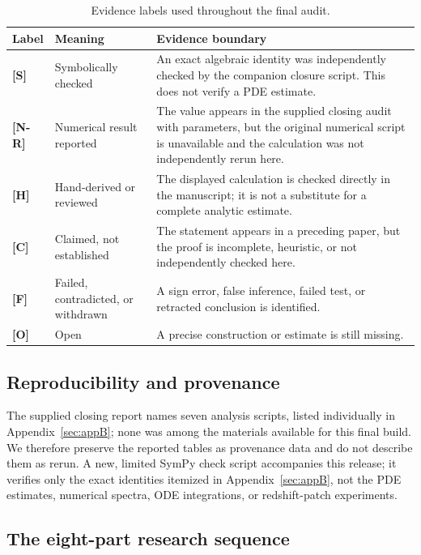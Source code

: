 \documentclass[11pt,a4paper]{article}
\newcommand{\VS}{\textcolor{vs}{\textbf{[S]}}}
\newcommand{\VN}{\textcolor{vn}{\textbf{[N-R]}}}
\newcommand{\VH}{\textcolor{vh}{\textbf{[H]}}}
\newcommand{\CC}{\textcolor{cc}{\textbf{[C]}}}
\newcommand{\FF}{\textcolor{ff}{\textbf{[F]}}}
\newcommand{\OO}{\textcolor{oo}{\textbf{[O]}}}
\theoremstyle{remark}
\theoremstyle{definition}
\begin{document}
\begin{table}[H]
\centering
\caption{Evidence labels used throughout the final audit.}
\label{tab:status}
\small
\begin{tabularx}{\linewidth}{@{}l l X@{}}
\toprule
Label & Meaning & Evidence boundary \\
\midrule
\VS & Symbolically checked & An exact algebraic identity was independently checked by the companion closure script. This does not verify a PDE estimate. \\
\VN & Numerical result reported & The value appears in the supplied closing audit with parameters, but the original numerical script is unavailable and the calculation was not independently rerun here. \\
\VH & Hand-derived or reviewed & The displayed calculation is checked directly in the manuscript; it is not a substitute for a complete analytic estimate. \\
\CC & Claimed, not established & The statement appears in a preceding paper, but the proof is incomplete, heuristic, or not independently checked here. \\
\FF & Failed, contradicted, or withdrawn & A sign error, false inference, failed test, or retracted conclusion is identified. \\
\OO & Open & A precise construction or estimate is still missing. \\
\bottomrule
\end{tabularx}
\end{table}

\subsection{Reproducibility and provenance}

The supplied closing report names seven analysis scripts, listed individually in Appendix~\ref{sec:appB}; none was among the materials available for this final build. We therefore preserve the reported tables as provenance data and do not describe them as rerun. A new, limited SymPy check script accompanies this release; it verifies only the exact identities itemized in Appendix~\ref{sec:appB}, not the PDE estimates, numerical spectra, ODE integrations, or redshift-patch experiments.

\subsection{The eight-part research sequence}
\end{document}
